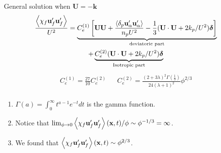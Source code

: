 \documentclass{sintefbeamer}
\begin{document}
\begin{frame}
  {General solution when $\textbf{U} = -\textbf{k}$}
  \begin{multline}
    \frac{\left<\chi_f \textbf{u}_f'\textbf{u}_f'\right>}{U^2}
    = 
    \underbrace{C^{(1)}_e \left[
        \textbf{U}\textbf{U}
        + \frac{\left<\delta_p \textbf{u}_\alpha'\textbf{u}_\alpha'\right>}{n_p U^2}
         - \frac{1}{3}(\textbf{U}\cdot \textbf{U}+2k_p/U^2)\bm\delta
    \right]}_\text{deviatoric part}\\
    + 
    \underbrace{ C^{(2)}_e  (\textbf{U}\cdot \textbf{U}+2k_p/U^2)\bm\delta}_\text{Isotropic part}
\end{multline}
\begin{align*}
  C_e^{(1)} =
  \frac{27}{10}
  C_e^{(2)}
  &&  C_e^{(2)} = \frac{(2+3\lambda)^2 \Gamma(\frac{1}{3})}{24(\lambda+1)^2}\phi^{2/3} \\
\end{align*}
\begin{enumerate}
  \item $\Gamma(a) = \int_0^\infty t^{a-1} e^{-t} dt $ is the gamma  function. 
  \item  Notice that $\lim_{\phi \to 0} \left<\chi_f \textbf{u}'_f\textbf{u}'_f\right>(\textbf{x},t)/\phi \sim\phi^{-1/3} =\infty$. 
  \item We found that $\left<\chi_f \textbf{u}'_f\textbf{u}'_f\right>(\textbf{x},t)\sim\phi^{2/3}$.  
\end{enumerate}
\end{frame}
\end{document}
